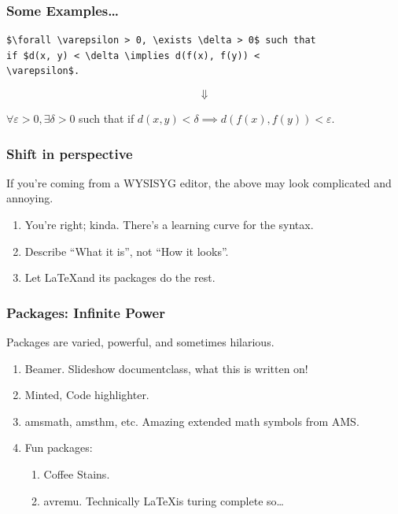 \documentclass{beamer}
\begin{document}
\begin{frame}[fragile]
\frametitle{Some Examples\dots}

\begin{verbatim}
$\forall \varepsilon > 0, \exists \delta > 0$ such that 
if $d(x, y) < \delta \implies d(f(x), f(y)) < 
\varepsilon$.
\end{verbatim}

\[ \Downarrow \]

\begin{framed}
$\forall \varepsilon > 0, \exists \delta > 0$ such that 
if $d(x, y) < \delta \implies d(f(x), f(y)) < 
\varepsilon$.
\end{framed}

\end{frame}

\begin{frame}[fragile]
\frametitle{Shift in perspective}

If you're coming from a WYSISYG editor, the above may look complicated and
annoying.

\begin{enumerate}
\item<1-> You're right; kinda. There's a learning curve for the syntax.
\item<2-> Describe ``What it is'', not ``How it looks''.
\item<3-> Let \LaTeX\@ and its packages do the rest.
\end{enumerate}

\end{frame}

\begin{frame}[fragile]
\frametitle{Packages: Infinite Power}

Packages are varied, powerful, and sometimes hilarious.

\begin{enumerate}
    \item<1-> Beamer. Slideshow documentclass, what this is written on!
    \item<2-> Minted, Code highlighter.
    \item<3-> amsmath, amsthm, etc. Amazing extended math symbols from AMS.
    \item<4-> Fun packages:
        \begin{enumerate}
            \item Coffee Stains.
            \item avremu. Technically \LaTeX\@ is turing complete so\dots
        \end{enumerate}
\end{enumerate}

\end{frame}
\end{document}
